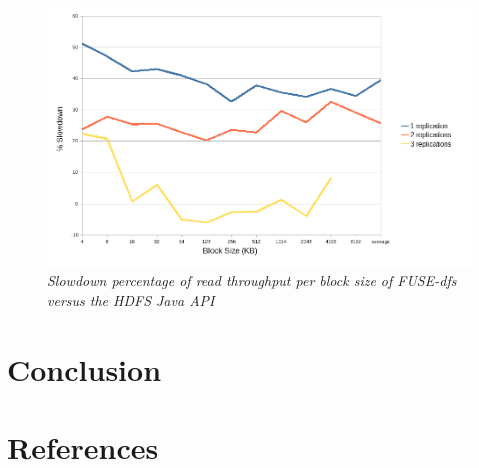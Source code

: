 \documentclass[11]{article}
\begin{document}
\begin{figure}
 \centering
 \includegraphics[totalheight=.25\textheight,
width=.75\textwidth,bb=0 0 985 682, scale=0.50]{images/WriteSlowdown-4Datanodes.png}
 \caption{\emph{Slowdown percentage of \textit{read} throughput per block size of FUSE-dfs versus the HDFS Java API}}
\end{figure}

\section{Conclusion}

\section{References}
\end{document}
